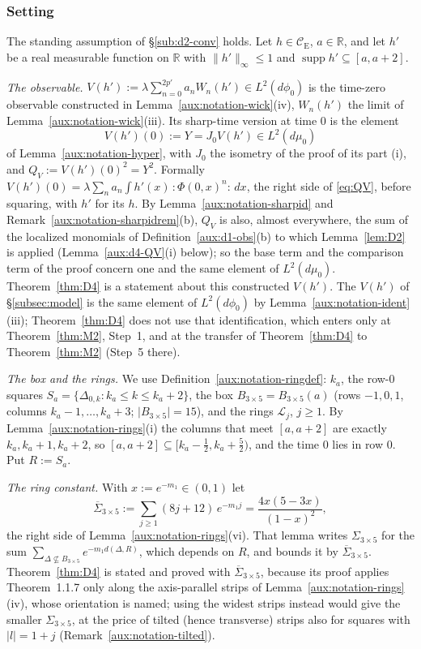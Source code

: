 \documentclass[11pt,a4paper]{article}
\theoremstyle{plain}
\theoremstyle{definition}
\theoremstyle{plain}
\theoremstyle{definition}
\newcommand{\R}{\mathbb{R}}
\newcommand{\CE}{\mathcal{C}_{\mathrm E}}
\DeclareMathOperator{\supp}{supp}
\newcommand{\dmu}{d\mu_0}
\newcommand{\dphi}{d\phi_0}
\begin{document}
\subsubsection{Setting}\label{sub:d4-setting}

The standing assumption of \S\ref{sub:d2-conv} holds.  Let $h\in\CE$, $a\in\R$, and let $h'$ be a
real measurable function on $\R$ with $\|h'\|_\infty\le1$ and $\supp h'\subseteq[a,a+2]$.

\emph{The observable.}  $V(h'):=\lambda\sum_{n=0}^{2p'}a_nW_n(h')\in L^2(\dphi)$ is the
time-zero observable constructed in Lemma~\ref{aux:notation-wick}(iv), $W_n(h')$ the limit of
Lemma~\ref{aux:notation-wick}(iii).  Its sharp-time version at time $0$ is the element
\[
 V(h')(0):=Y=J_0V(h')\in L^2(\dmu)
\]
of Lemma~\ref{aux:notation-hyper}, with $J_0$ the isometry of the proof of its part (i), and
$Q_V:=V(h')(0)^2=Y^2$.  Formally $V(h')(0)=\lambda\sum_na_n\int h'(x)\,{:}\Phi(0,x)^n{:}\,dx$, the
right side of \eqref{eq:QV}, before squaring, with $h'$ for its $h$.  By Lemma~\ref{aux:notation-sharpid} and
Remark~\ref{aux:notation-sharpidrem}(b), $Q_V$ is also, almost everywhere, the sum of the
localized monomials of Definition~\ref{aux:d1-obs}(b) to which Lemma~\ref{lem:D2} is applied
(Lemma~\ref{aux:d4-QV}(i) below); so the base term and the comparison term of the proof concern
one and the same element of $L^2(\dmu)$.  Theorem~\ref{thm:D4} is a statement about this
constructed $V(h')$.  The $V(h')$ of \S\ref{subsec:model} is the same element of
$L^2(\dphi)$ by Lemma~\ref{aux:notation-ident}(iii); Theorem~\ref{thm:D4} does not use that
identification, which enters only at Theorem~\ref{thm:M2}, Step~1, and at the transfer of
Theorem~\ref{thm:D4} to Theorem~\ref{thm:M2} (Step~5 there).

\emph{The box and the rings.}  We use Definition~\ref{aux:notation-ringdef}: $k_a$, the row-$0$
squares $S_a=\{\Delta_{0,k}:k_a\le k\le k_a+2\}$, the box $B_{3\times5}=B_{3\times5}(a)$ (rows
$-1,0,1$, columns $k_a-1,\dots,k_a+3$; $|B_{3\times5}|=15$), and the rings $\mathcal L_j$, $j\ge1$.
By Lemma~\ref{aux:notation-rings}(i) the columns that meet $[a,a+2]$ are exactly
$k_a,k_a+1,k_a+2$, so $[a,a+2]\subseteq[k_a-\frac12,k_a+\frac52)$, and the time $0$ lies in
row $0$.  Put $R:=S_a$.

\emph{The ring constant.}  With $x:=e^{-m_1}\in(0,1)$ let
\[
 \overline\Sigma_{3\times5}:=\sum_{j\ge1}(8j+12)\,e^{-m_1j}=\frac{4x(5-3x)}{(1-x)^2},
\]
the right side of Lemma~\ref{aux:notation-rings}(vi).  That lemma writes $\Sigma_{3\times5}$ for
the sum $\sum_{\Delta\not\subseteq B_{3\times5}}e^{-m_1d(\Delta,R)}$, which depends on $R$, and
bounds it by $\overline\Sigma_{3\times5}$.  Theorem~\ref{thm:D4} is stated and proved with
$\overline\Sigma_{3\times5}$, because its proof applies Theorem~1.1.7 only along the axis-parallel
strips of Lemma~\ref{aux:notation-rings}(iv), whose orientation is named; using the widest strips
instead would give the smaller $\Sigma_{3\times5}$, at the price of tilted (hence transverse)
strips also for squares with $|l|=1+j$ (Remark~\ref{aux:notation-tilted}).
\end{document}
